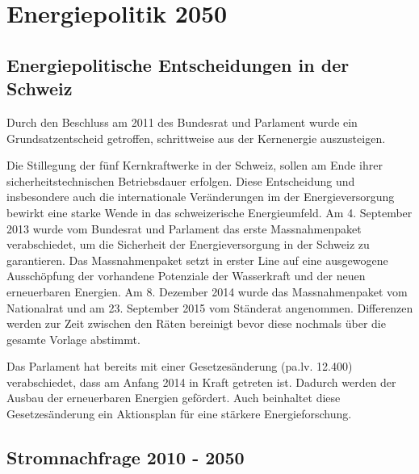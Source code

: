\chapter{Energiepolitik 2050}

\section{Energiepolitische Entscheidungen in der Schweiz}
Durch den Beschluss am 2011 des Bundesrat und Parlament wurde ein Grundsatzentscheid getroffen,
schrittweise aus der Kernenergie auszusteigen\cite{bfe_energiestrategie}. 
\par
Die Stillegung der fünf Kernkraftwerke in der Schweiz, sollen am Ende ihrer sicherheitstechnischen
Betriebsdauer erfolgen. Diese Entscheidung und insbesondere auch die internationale Veränderungen 
im der Energieversorgung bewirkt eine starke Wende in das schweizerische Energieumfeld.
Am 4. September 2013 wurde vom Bundesrat und Parlament das erste Massnahmenpaket verabschiedet, um
die Sicherheit der Energieversorgung in der Schweiz zu garantieren. Das Massnahmenpaket setzt in erster
Line auf eine ausgewogene Ausschöpfung der vorhandene Potenziale der Wasserkraft und der neuen erneuerbaren
Energien. Am 8. Dezember 2014 wurde das Massnahmenpaket vom Nationalrat und am 23. September 2015 vom Ständerat
angenommen. Differenzen werden zur Zeit zwischen den Räten bereinigt bevor diese nochmals über die
gesamte Vorlage abstimmt. 
\par
Das Parlament hat bereits mit einer Gesetzesänderung (pa.lv. 12.400) verabschiedet, dass am Anfang 2014 in
Kraft getreten ist. Dadurch werden der Ausbau der erneuerbaren Energien gefördert. Auch beinhaltet
diese Gesetzesänderung ein Aktionsplan für eine stärkere Energieforschung.

\section{Stromnachfrage 2010 - 2050}

